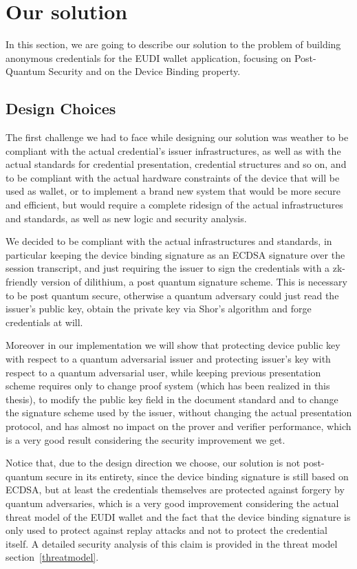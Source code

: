 \documentclass[binding=0.6cm,oneside,noexaminfo]{sapthesis}
\begin{document}
\chapter{Our solution}
\label{oursolution}
In this section, we are going to describe our solution to the problem of building anonymous credentials for the EUDI wallet
application, focusing on Post-Quantum Security and on the Device Binding property.

\section{Design Choices}
\label{designchoice}
The first challenge we had to face while designing our solution was weather to be compliant with the actual credential's
issuer infrastructures, as well as with the actual standards for credential presentation, credential structures and so on,
and to be compliant with the actual hardware constraints of the device that will be used as wallet, or to implement a brand
new system that would be more secure and efficient, but would require a complete ridesign of the actual infrastructures and 
standards, as well as new logic and security analysis.

We decided to be compliant with the actual infrastructures and standards, in particular keeping the device binding signature
as an ECDSA signature over the session transcript, and just requiring the issuer to sign the credentials with a zk-friendly version of 
dilithium, a post quantum signature scheme. This is necessary to be post quantum secure, otherwise a quantum adversary could
just read the issuer's public key, obtain the private key via Shor's algorithm and forge credentials at will.

Moreover in our implementation we will show that protecting device public key with respect to a quantum adversarial issuer
and protecting issuer's key with respect to a quantum adversarial user, while keeping previous presentation scheme requires
only to change proof system (which has been realized in this thesis), to modify the public key field in the document standard
and to change the signature scheme used by the issuer, without changing the actual presentation protocol, and has almost
no impact on the prover and verifier performance, which is a very good result considering the security improvement we get.

Notice that, due to the design direction we choose, our solution is not post-quantum secure in its entirety, since the device binding
signature is still based on ECDSA, but at least the credentials themselves are protected against forgery by quantum adversaries, 
which is a very good improvement considering the actual threat model of the EUDI wallet and the fact that the device binding 
signature is only used to protect against replay attacks and not to protect the credential itself. A detailed security analysis of
this claim is provided in the threat model section~\cref{threatmodel}.
\end{document}
